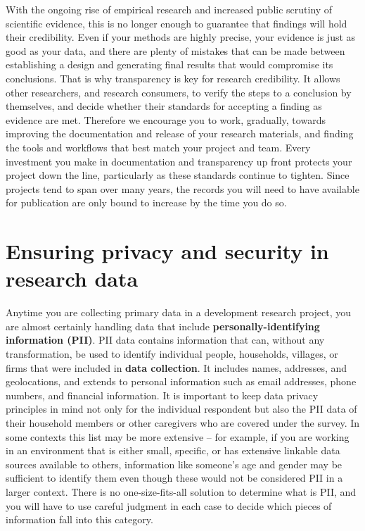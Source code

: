 With the ongoing rise of empirical research and increased public scrutiny of scientific evidence,
this is no longer enough to guarantee that findings will hold their credibility.
Even if your methods are highly precise,
your evidence is just as good as your data,
and there are plenty of mistakes that can be made between establishing a design and generating final results that would compromise its conclusions.
That is why transparency is key for research credibility.
It allows other researchers, and research consumers,
to verify the steps to a conclusion by themselves,
and decide whether their standards for accepting a finding as evidence are met.
Therefore we encourage you to work, gradually, towards improving
the documentation and release of your research materials,
and finding the tools and workflows that best match your project and team.
Every investment you make in documentation and transparency up front
protects your project down the line, particularly as these standards continue to tighten.
Since projects tend to span over many years,
the records you will need to have available for publication are
only bound to increase by the time you do so.



\section{Ensuring privacy and security in research data}

Anytime you are collecting primary data in a development research project,
you are almost certainly handling data that include \textbf{personally-identifying information (PII)}.
PII data contains information that can, without any transformation, be used to identify
individual people, households, villages, or firms that were included in \textbf{data collection}.
It includes names, addresses, and geolocations, and extends to personal information
such as email addresses, phone numbers, and financial information.
It is important to keep data privacy principles in mind not only for the individual respondent but also the PII data of their household members or other caregivers who are covered under the survey.
In some contexts this list may be more extensive --
for example, if you are working in an environment that is either small, specific,
or has extensive linkable data sources available to others,
information like someone's age and gender may be sufficient to identify them
even though these would not be considered PII in a larger context.
There is no one-size-fits-all solution to determine what is PII, and you will have to use careful judgment in each case
to decide which pieces of information fall into this category.

